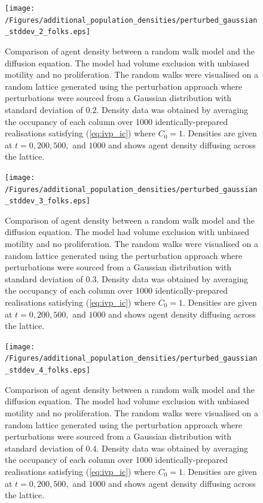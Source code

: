 \documentclass[11pt,titlepage,a4paper]{article}
\begin{document}
\begin{appendix}
		\clearpage
		\begin{figure}[tbh]
			\centering
				\texttt{[image: /Figures/additional\_population\_densities/perturbed\_gaussian\_stddev\_2\_folks.eps]}
			\caption{Comparison of agent density between a random walk model and the diffusion equation. The model had volume exclusion with unbiased motility and no proliferation. The random walks were visualised on a random lattice generated using the perturbation approach where perturbations were sourced from a Gaussian distribution with standard deviation of $0.2$. Density data was obtained by averaging the occupancy of each column over 1000 identically-prepared realisations satisfying (\ref{eq:ivp_ic}) where $C_0 = 1$. Densities are given at $t = 0, 200, 500,$ and $1000$ and shows agent density diffusing across the lattice.}
			\label{fig:perturbed_gaussian_stddev_2_folks}
		\end{figure}

		\clearpage
		\begin{figure}[tbh]
			\centering
				\texttt{[image: /Figures/additional\_population\_densities/perturbed\_gaussian\_stddev\_3\_folks.eps]}
			\caption{Comparison of agent density between a random walk model and the diffusion equation. The model had volume exclusion with unbiased motility and no proliferation. The random walks were visualised on a random lattice generated using the perturbation approach where perturbations were sourced from a Gaussian distribution with standard deviation of $0.3$. Density data was obtained by averaging the occupancy of each column over 1000 identically-prepared realisations satisfying (\ref{eq:ivp_ic}) where $C_0 = 1$. Densities are given at $t = 0, 200, 500,$ and $1000$ and shows agent density diffusing across the lattice.}
			\label{fig:perturbed_gaussian_stddev_3_folks}
		\end{figure}

		\clearpage
		\begin{figure}[tbh]
			\centering
				\texttt{[image: /Figures/additional\_population\_densities/perturbed\_gaussian\_stddev\_4\_folks.eps]}
			\caption{Comparison of agent density between a random walk model and the diffusion equation. The model had volume exclusion with unbiased motility and no proliferation. The random walks were visualised on a random lattice generated using the perturbation approach where perturbations were sourced from a Gaussian distribution with standard deviation of $0.4$. Density data was obtained by averaging the occupancy of each column over 1000 identically-prepared realisations satisfying (\ref{eq:ivp_ic}) where $C_0 = 1$. Densities are given at $t = 0, 200, 500,$ and $1000$ and shows agent density diffusing across the lattice.}
			\label{fig:perturbed_gaussian_stddev_4_folks}
		\end{figure}


\end{appendix}
\end{document}
